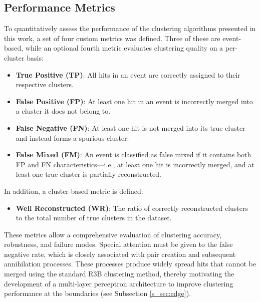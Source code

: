 \documentclass[final,5p,times,twocolumn]{elsarticle}
\begin{document}
\subsection{Performance Metrics}\label{s_sec:metrics}
To quantitatively assess the performance of the clustering algorithms presented in this work, a set of four custom metrics was defined. Three of these are event-based, while an optional fourth metric evaluates clustering quality on a per-cluster basis:
\begin{itemize}
    \item \textbf{True Positive (TP)}: All hits in an event are correctly assigned to their respective clusters.
    \item \textbf{False Positive (FP)}: At least one hit in an event is incorrectly merged into a cluster it does not belong to.
    \item \textbf{False Negative (FN)}: At least one hit is not merged into its true cluster and instead forms a spurious cluster.
    \item \textbf{False Mixed (FM)}: An event is classified as false mixed if it contains both FP and FN characteristics—i.e., at least one hit is incorrectly merged, and at least one true cluster is partially reconstructed.
\end{itemize}
In addition, a cluster-based metric is defined:
\begin{itemize}
    \item \textbf{Well Reconstructed (WR)}: The ratio of correctly reconstructed clusters to the total number of true clusters in the dataset.
\end{itemize}
These metrics allow a comprehensive evaluation of clustering accuracy, robustness, and failure modes.\newline
Special attention must be given to the false negative rate, which is closely associated with pair creation and subsequent annihilation processes. These processes produce widely spread hits that cannot be merged using the standard R3B clustering method, thereby motivating the development of a multi-layer perceptron architecture to improve clustering performance at the boundaries (see Subsection \ref{s_sec:edge}).\newline
\end{document}
